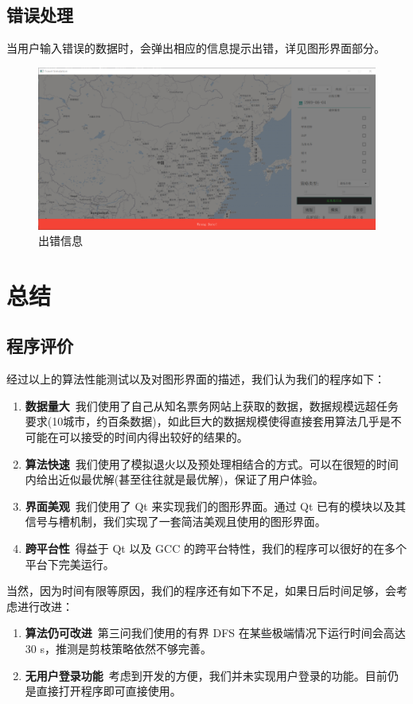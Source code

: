 \documentclass[lang=cn,blue,14pt]{elegantbook}
\begin{document}
\section{错误处理}
当用户输入错误的数据时，会弹出相应的信息提示出错，详见图形界面部分。

\begin{figure}[!htbp]
	\centering
	\includegraphics[width=.8\textwidth]{exception.png}
	\caption{出错信息}
	\label{error}
\end{figure}

\chapter{总结}

\section{程序评价}
经过以上的算法性能测试以及对图形界面的描述，我们认为我们的程序如下：

\begin{enumerate}
	\item \textbf{数据量大}\ 我们使用了自己从知名票务网站上获取的数据，数据规模远超任务要求(10城市，约百条数据)，如此巨大的数据规模使得直接套用算法几乎是不可能在可以接受的时间内得出较好的结果的。
	\item \textbf{算法快速}\ 我们使用了模拟退火以及预处理相结合的方式。可以在很短的时间内给出近似最优解(甚至往往就是最优解)，保证了用户体验。
	\item \textbf{界面美观}\ 我们使用了 Qt 来实现我们的图形界面。通过 Qt 已有的模块以及其信号与槽机制，我们实现了一套简洁美观且使用的图形界面。
	\item \textbf{跨平台性}\ 得益于 Qt 以及 GCC 的跨平台特性，我们的程序可以很好的在多个平台下完美运行。
\end{enumerate}

当然，因为时间有限等原因，我们的程序还有如下不足，如果日后时间足够，会考虑进行改进：

\begin{enumerate}
	\item \textbf{算法仍可改进}\ 第三问我们使用的有界 DFS 在某些极端情况下运行时间会高达 30 s，推测是剪枝策略依然不够完善。
	\item \textbf{无用户登录功能}\ 考虑到开发的方便，我们并未实现用户登录的功能。目前仍是直接打开程序即可直接使用。
\end{enumerate}
\end{document}

